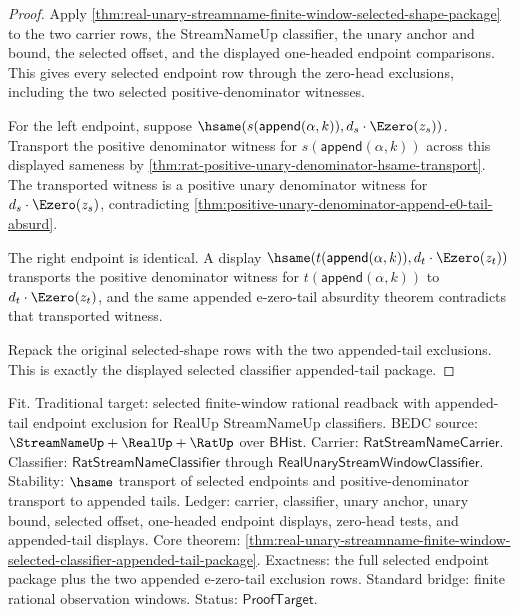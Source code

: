 \begin{proof}
Apply
\autoref{thm:real-unary-streamname-finite-window-selected-shape-package}
to the two carrier rows, the StreamNameUp classifier, the unary anchor and
bound, the selected offset, and the displayed one-headed endpoint comparisons.
This gives every selected endpoint row through the zero-head exclusions,
including the two selected positive-denominator witnesses.

For the left endpoint, suppose
$\hsame(s(\mathsf{append}(\alpha,k)),d_s\cdot\Ezero(z_s))$. Transport the
positive denominator witness for $s(\mathsf{append}(\alpha,k))$ across this
displayed sameness by
\autoref{thm:rat-positive-unary-denominator-hsame-transport}. The transported
witness is a positive unary denominator witness for $d_s\cdot\Ezero(z_s)$,
contradicting
\autoref{thm:positive-unary-denominator-append-e0-tail-absurd}.

The right endpoint is identical. A display
$\hsame(t(\mathsf{append}(\alpha,k)),d_t\cdot\Ezero(z_t))$ transports the
positive denominator witness for $t(\mathsf{append}(\alpha,k))$ to
$d_t\cdot\Ezero(z_t)$, and the same appended e-zero-tail absurdity theorem
contradicts that transported witness.

Repack the original selected-shape rows with the two appended-tail exclusions.
This is exactly the displayed selected classifier appended-tail package.
\end{proof}

Fit. Traditional target: selected finite-window rational readback with
appended-tail endpoint exclusion for RealUp StreamNameUp classifiers. BEDC
source: $\StreamNameUp+\RealUp+\RatUp$ over $\mathsf{BHist}$. Carrier:
$\mathsf{RatStreamNameCarrier}$. Classifier:
$\mathsf{RatStreamNameClassifier}$ through
$\mathsf{RealUnaryStreamWindowClassifier}$. Stability: $\hsame$ transport of
selected endpoints and positive-denominator transport to appended tails.
Ledger: carrier, classifier, unary anchor, unary bound, selected offset,
one-headed endpoint displays, zero-head tests, and appended-tail displays. Core
theorem:
\autoref{thm:real-unary-streamname-finite-window-selected-classifier-appended-tail-package}.
Exactness: the full selected endpoint package plus the two appended e-zero-tail
exclusion rows. Standard bridge: finite rational observation windows. Status:
$\mathsf{ProofTarget}$.

